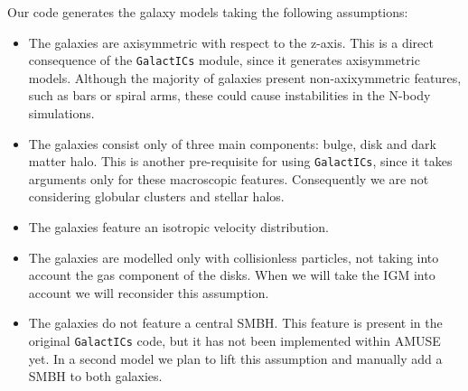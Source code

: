 \documentclass[a4paper,12pt, english]{article}
\begin{document}
Our code generates the galaxy models taking the following assumptions:
\begin{itemize}
    \item The galaxies are axisymmetric with respect to the z-axis. This is a direct consequence of the \texttt{GalactICs} module, since it generates axisymmetric models. Although the majority of galaxies present non-axixymmetric features, such as bars or spiral arms, these could cause instabilities in the N-body simulations.
    \item The galaxies consist only of three main components: bulge, disk and dark matter halo. This is another pre-requisite for using \texttt{GalactICs}, since it takes arguments only for these macroscopic features. Consequently we are not considering globular clusters and stellar halos.
    \item The galaxies feature an isotropic velocity distribution.
    \item The galaxies are modelled only with collisionless particles, not taking into account the gas component of the disks. When we will take the IGM into account we will reconsider this assumption.
    \item The galaxies do not feature a central SMBH. This feature is present in the original \texttt{GalactICs} code, but it has not been implemented within AMUSE yet. In a second model we plan to lift this assumption and manually add a SMBH to both galaxies.
\end{itemize}\par
\smallskip
\end{document}
